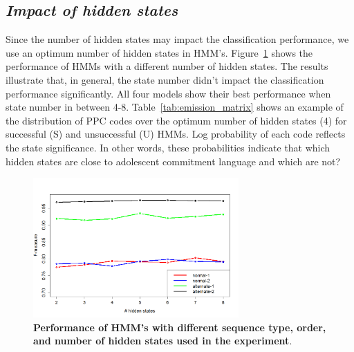 \documentclass{amia}
\begin{document}
\subsection*{\textit{Impact of hidden states}}
Since the number of hidden states may impact the classification
performance, we use an optimum number of hidden states in HMM's. Figure~\ref{fig:hidden-states} shows the performance of HMMs with a different number of hidden states. The results illustrate that, in general, the state number didn't impact the classification performance significantly. All four models show their best performance when state number in between 4-8. Table~\ref{tab:emission_matrix} shows an example of the distribution of PPC codes over the optimum number of hidden states (4) for successful (S) and unsuccessful (U) HMMs. Log probability of each code reflects the state significance. In other words, these probabilities indicate that which hidden states are close to adolescent commitment language and which are not?

\begin{figure}[htb!]
    \centering
    \includegraphics[width=0.70\textwidth]{figures/hidden-states.png}
    \caption{\textbf{Performance of HMM's with different sequence type, order, and number of hidden states used in the experiment}.}
    \label{fig:hidden-states}
\end{figure}
\end{document}
